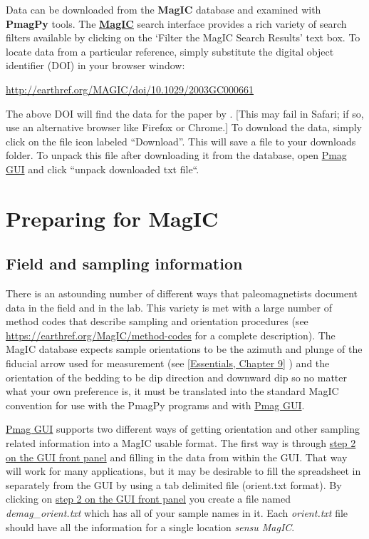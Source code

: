 \documentclass[11pt]{book}
\begin{document}
{Data can be downloaded from the {\bf MagIC} database and examined with {\bf PmagPy} tools.   The \href{http://earthref.org/MAGIC/search/}{\bf MagIC} search interface provides a rich variety of search filters available by clicking on the `Filter the MagIC Search Results' text box.    To locate data from a particular reference,  simply substitute the digital object identifier (DOI) in your browser window:

\href{http://earthref.org/MAGIC/doi/10.1029/2003GC000661}{http://earthref.org/MAGIC/doi/10.1029/2003GC000661}

\noindent The above DOI will find the data for the paper by \cite{tauxe04b}.  [This may fail in Safari; if so, use an alternative browser like Firefox or Chrome.]     To download the data, simply click on the file icon labeled ``Download''.  This will save a file to your downloads folder.
 To unpack this file after downloading it from the database, open \href{#pmag_gui.py}{Pmag GUI} and click ``unpack downloaded txt file``.


 \section{Preparing for MagIC}


\subsection{Field and sampling information}

 There is an astounding number of different ways that paleomagnetists document data in the field and in the lab. This variety is met with a large number  of method codes that describe sampling and orientation procedures (see \url{https://earthref.org/MagIC/method-codes} for a complete description).   The MagIC database expects sample orientations to be the azimuth and plunge of the fiducial arrow used for measurement (see  \href{http://earthref.org/MAGIC/books/Tauxe/Essentials/WebBook3ch2.html#ch2}{[Essentials, Chapter 9]} )  and the orientation of the bedding to be dip direction and downward dip so no matter what your own preference is, it must be translated into the standard MagIC convention for use with the PmagPy programs and with \href{#pmag_gui.py}{Pmag GUI}.

\href{#pmag_gui.py}{Pmag GUI}  supports two different ways of getting orientation and other sampling related information into a MagIC usable format.  The first way is through \href{#orient}{step 2 on the GUI front panel} and filling in the data from within the GUI.  That way will work for many applications, but it may be desirable to fill the spreadsheet in separately from the GUI by using  a tab delimited file (orient.txt format).   By clicking on  \href{#orient}{step 2 on the GUI front panel}  you create a file named {\it demag\_orient.txt}  which has all of your sample names in it.   Each {\it orient.txt} file should  have all the information for a single location {\it sensu MagIC}.


}
\end{document}
